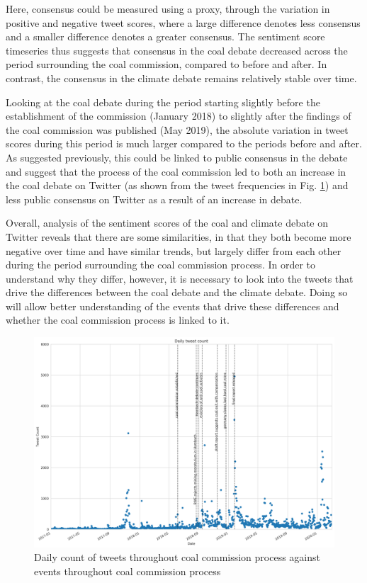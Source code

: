 \documentclass[12pt,onecolumn,twoside]{layout}
\begin{document}
Here, consensus could be measured using a proxy, through the variation in positive and negative tweet scores, where a large difference denotes less consensus and a smaller difference denotes a greater consensus. The sentiment score timeseries thus suggests that consensus in the coal debate decreased across the period surrounding the coal commission, compared to before and after. In contrast, the consensus in the climate debate remains relatively stable over time. 

Looking at the coal debate during the period starting slightly before the establishment of the commission (January 2018) to slightly after the findings of the coal commission was published (May 2019), the absolute variation in tweet scores during this period is much larger compared to the periods before and after. As suggested previously, this could be linked to public consensus in the debate and suggest that the process of the coal commission led to both an increase in the coal debate on Twitter (as shown from the tweet frequencies in Fig. \ref{fig:tweet_count_event_timeline}) and less public consensus on Twitter as a result of an increase in debate. 

Overall, analysis of the sentiment scores of the coal and climate debate on Twitter reveals that there are some similarities, in that they both become more negative over time and have similar trends, but largely differ from each other during the period surrounding the coal commission process. In order to understand why they differ, however, it is necessary to look into the tweets that drive the differences between the coal debate and the climate debate. Doing so will allow better understanding of the events that drive these differences and whether the coal commission process is linked to it. 

\begin{figure}
	\begin{center}
		\includegraphics[width=\textwidth]{figures/sa_tweet_count_event_timeline3}
	\end{center}
	\caption{Daily count of tweets throughout coal commission process against events throughout coal commission process}
	\label{fig:tweet_count_event_timeline}
\end{figure}
\end{document}
